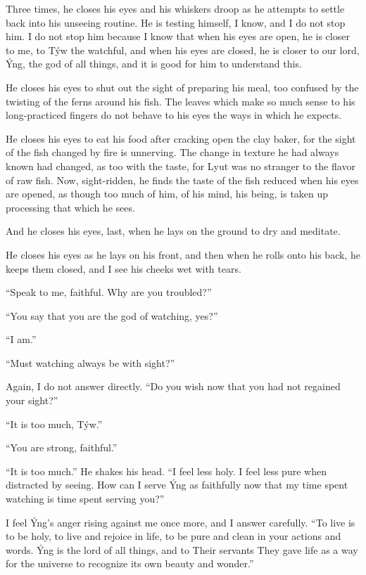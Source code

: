 Three times, he closes his eyes and his whiskers droop as he attempts to settle back into his unseeing routine. He is testing himself, I know, and I do not stop him. I do not stop him because I know that when his eyes are open, he is closer to me, to Týw the watchful, and when his eyes are closed, he is closer to our lord, Ýng, the god of all things, and it is good for him to understand this.

He closes his eyes to shut out the sight of preparing his meal, too confused by the twisting of the ferns around his fish. The leaves which make so much sense to his long-practiced fingers do not behave to his eyes the ways in which he expects.

He closes his eyes to eat his food after cracking open the clay baker, for the sight of the fish changed by fire is unnerving. The change in texture he had always known had changed, as too with the taste, for Lyut was no stranger to the flavor of raw fish. Now, sight-ridden, he finds the taste of the fish reduced when his eyes are opened, as though too much of him, of his mind, his being, is taken up processing that which he sees.

And he closes his eyes, last, when he lays on the ground to dry and meditate.

He closes his eyes as he lays on his front, and then when he rolls onto his back, he keeps them closed, and I see his cheeks wet with tears.

``Speak to me, faithful. Why are you troubled?''

``You say that you are the god of watching, yes?''

``I am.''

``Must watching always be with sight?''

Again, I do not answer directly. ``Do you wish now that you had not regained your sight?''

``It is too much, Týw.''

``You are strong, faithful.''

``It is too much.'' He shakes his head. ``I feel less holy. I feel less pure when distracted by seeing. How can I serve Ýng as faithfully now that my time spent watching is time spent serving you?''

I feel Ýng's anger rising against me once more, and I answer carefully. ``To live is to be holy, to live and rejoice in life, to be pure and clean in your actions and words. Ýng is the lord of all things, and to Their servants They gave life as a way for the universe to recognize its own beauty and wonder.''

